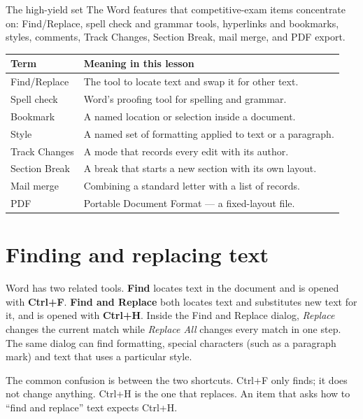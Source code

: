 \begin{definitionbox}{The high-yield set}
The Word features that competitive-exam items concentrate on: Find/Replace,
spell check and grammar tools, hyperlinks and bookmarks, styles, comments,
Track Changes, Section Break, mail merge, and PDF export.
\end{definitionbox}

\begin{center}
\begin{tabular}{p{}p{}}
\toprule
\textbf{Term} & \textbf{Meaning in this lesson} \\
\midrule
Find/Replace & The tool to locate text and swap it for other text. \\
Spell check & Word's proofing tool for spelling and grammar. \\
Bookmark & A named location or selection inside a document. \\
Style & A named set of formatting applied to text or a paragraph. \\
Track Changes & A mode that records every edit with its author. \\
Section Break & A break that starts a new section with its own layout. \\
Mail merge & Combining a standard letter with a list of records. \\
PDF & Portable Document Format --- a fixed-layout file. \\
\bottomrule
\end{tabular}
\end{center}

\section{Finding and replacing text}
Word has two related tools. \textbf{Find} locates text in the document and is
opened with \textbf{Ctrl+F}. \textbf{Find and Replace} both locates text and
substitutes new text for it, and is opened with \textbf{Ctrl+H}. Inside the
Find and Replace dialog, \emph{Replace} changes the current match while
\emph{Replace All} changes every match in one step. The same dialog can find
formatting, special characters (such as a paragraph mark) and text that uses a
particular style.

The common confusion is between the two shortcuts. Ctrl+F only finds; it does
not change anything. Ctrl+H is the one that replaces. An item that asks how to
``find and replace'' text expects Ctrl+H.

